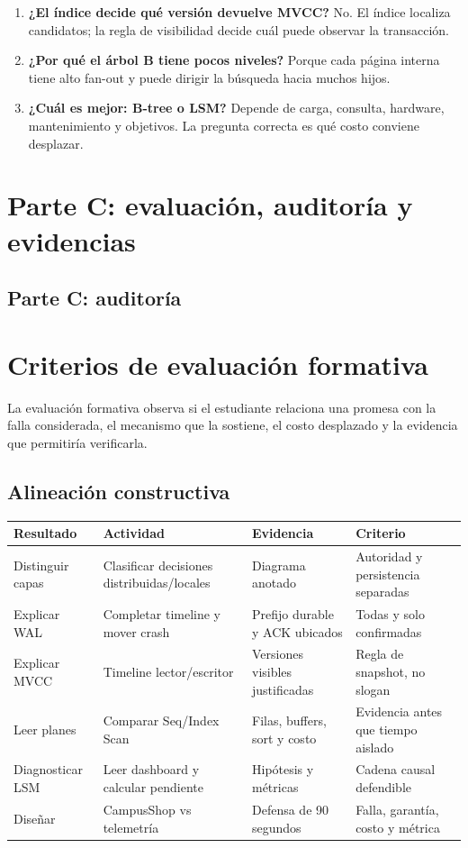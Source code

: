 \documentclass[variant=docente,cover=institutional,mode=screen]{ua-engineering-v6-article}
\begin{document}
\begin{enumerate}
\item \textbf{¿El índice decide qué versión devuelve MVCC?} No. El índice localiza candidatos; la regla de visibilidad decide cuál puede observar la transacción.

\item \textbf{¿Por qué el árbol B tiene pocos niveles?} Porque cada página interna tiene alto fan-out y puede dirigir la búsqueda hacia muchos hijos.

\item \textbf{¿Cuál es mejor: B-tree o LSM?} Depende de carga, consulta, hardware, mantenimiento y objetivos. La pregunta correcta es qué costo conviene desplazar.
\end{enumerate}

\section{Parte C: evaluación, auditoría y evidencias}

\subsection*{Parte C: auditoría}

\section{Criterios de evaluación formativa}

La evaluación formativa observa si el estudiante relaciona una promesa con la falla considerada, el mecanismo que la sostiene, el costo desplazado y la evidencia que permitiría verificarla.

\subsection{Alineación constructiva}

\begin{center}
\small
\begin{tabular}{p{}p{}p{}p{}}
\toprule
Resultado & Actividad & Evidencia & Criterio \\
\midrule
Distinguir capas & Clasificar decisiones distribuidas/locales & Diagrama anotado & Autoridad y persistencia separadas \\
Explicar WAL & Completar timeline y mover crash & Prefijo durable y ACK ubicados & Todas y solo confirmadas \\
Explicar MVCC & Timeline lector/escritor & Versiones visibles justificadas & Regla de snapshot, no slogan \\
Leer planes & Comparar Seq/Index Scan & Filas, buffers, sort y costo & Evidencia antes que tiempo aislado \\
Diagnosticar LSM & Leer dashboard y calcular pendiente & Hipótesis y métricas & Cadena causal defendible \\
Diseñar & CampusShop vs telemetría & Defensa de 90 segundos & Falla, garantía, costo y métrica \\
\bottomrule
\end{tabular}
\end{center}
\end{document}
